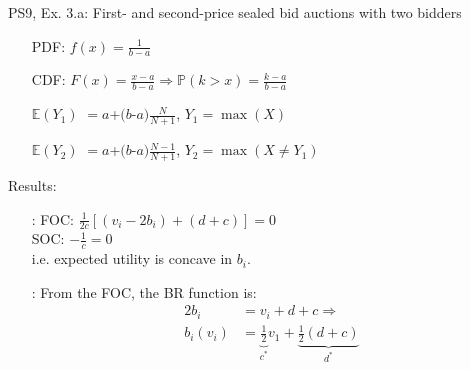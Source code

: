 \begin{frame}{PS9, Ex. 3.a: First- and second-price sealed bid auctions with two bidders}
\begin{multicols}{2}
      \begin{enumerate}
        \item[PDF:] $f(x)=\frac{1}{b-a}$
        \item[CDF:] $F(x)=\frac{x-a}{b-a}\Rightarrow\mathbb{P}(k>x)=\frac{k-a}{b-a}$
        \item[$\mathbb{E}(Y_1)$] $=a$+$(b$-$a)\frac{N}{N+1}$, $Y_1=\max(X)$
        \item[$\mathbb{E}(Y_2)$] $=a$+$(b$-$a)\frac{N-1}{N+1}$, $Y_2=\max(X\neq Y_1)$
      \end{enumerate}
      \vspace{-6pt}
      Results:
      \vspace{-6pt}
      \begin{itemize}
        \item[\nth{2}:] FOC: $\frac{1}{2c}[(v_i-2b_i)+(d+c)]=0$\\
                        SOC: $-\frac{1}{c}=0$\\
                        i.e. expected utility is concave in $b_i$.
        \item[\nth{3}:] From the FOC, the BR function is:\vspace{-6pt}
                        \begin{align*}
                          2b_i&=v_i+d+c\Rightarrow\\
                          b_i(v_i)&=\underbrace{\frac{1}{2}}_{c^*}v_1+\underbrace{\frac{1}{2}(d+c)}_{d^*}
                        \end{align*}
      \end{itemize}
      \vfill\null
    \end{multicols}
\end{frame}
